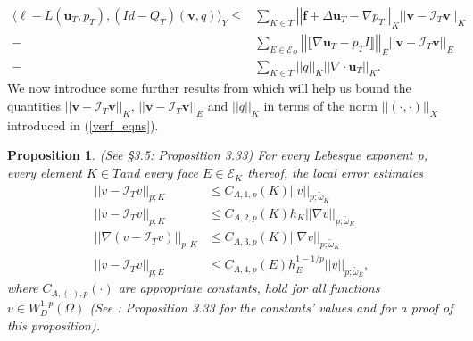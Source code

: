 \documentclass[12pt,a4paper]{article}
\newtheorem{proposition}[theorem]{Proposition}
\theoremstyle{definition}
\begin{document}
\begin{equation}\label{verf-a-posteriori-bound-cs}
\begin{aligned}
\langle \ell -L\left(\textbf{u}_T,p_T\right),\left(Id-Q_T\right)\left(\textbf{v},q\right) \rangle_Y\leq
&\sum_{K\in T}\left|\left|\textbf{f}+\Delta \textbf{u}_T-\nabla p_T \right|\right|_K \left|\left|\textbf{v}-\mathcal{I}_T\textbf{v}\right|\right|_K\\
-&\sum_{E\in \mathcal{E}_{\Omega}}\left|\left|\llbracket\nabla \textbf{u}_T-p_TI\rrbracket \right|\right|_E \left|\left|\textbf{v}-\mathcal{I}_T\textbf{v}\right|\right|_E\\
-&\sum_{K\in T}\left|\left|q\right|\right|_K\left|\left|\nabla \cdot \textbf{u}_T\right|\right|_K.
\end{aligned}
\end{equation}
We now introduce some further results from \cite{verfurth2013posteriori} which will help us bound the quantities $\left|\left|\textbf{v}-\mathcal{I}_T\textbf{v}\right|\right|_K$, $\left|\left|\textbf{v}-\mathcal{I}_T\textbf{v}\right|\right|_E$ and $\left|\left|q\right|\right|_K$ in terms of the norm $\left|\left|\left(\cdot,\cdot\right)\right|\right|_X$ introduced in (\ref{verf_eqns}).
\begin{proposition}{(See \cite{verfurth2013posteriori} \S3.5: Proposition 3.33)} \label{verf_prop_bounds} For every Lebesque exponent p, every element $K\in T$and every face $E\in\mathcal{E}_K$ thereof, the local error estimates
\begin{equation}
\begin{aligned}
\left|\left|v-\mathcal{I}_Tv\right|\right|_{p;K}&\leq C_{A,1,p}\left(K\right)\left|\left|v\right|\right|_{p;\widetilde{\omega}_K}\\
\left|\left|v-\mathcal{I}_Tv\right|\right|_{p;K}&\leq C_{A,2,p}\left(K\right)h_K\left|\left|\nabla v\right|\right|_{p;\widetilde{\omega}_K}\\
\left|\left|\nabla\left(v-\mathcal{I}_Tv\right)\right|\right|_{p;K}&\leq C_{A,3,p}\left(K\right)\left|\left|\nabla v\right|\right|_{p;\widetilde{\omega}_K}\\
\left|\left|v-\mathcal{I}_Tv\right|\right|_{p;E}&\leq C_{A,4,p}\left(E\right)h_E^{1-1/p}\left|\left|v\right|\right|_{p;\widetilde{\omega}_E},
\end{aligned}
\end{equation}
where $C_{A,\left(\cdot\right),p}\left(\cdot\right)$ are appropriate constants, hold for all functions $v\in W^{1,p}_D\left(\Omega\right)$ (See \cite{verfurth2013posteriori}: Proposition 3.33 for the constants' values and for a proof of this proposition).
\end{proposition}
\end{document}
